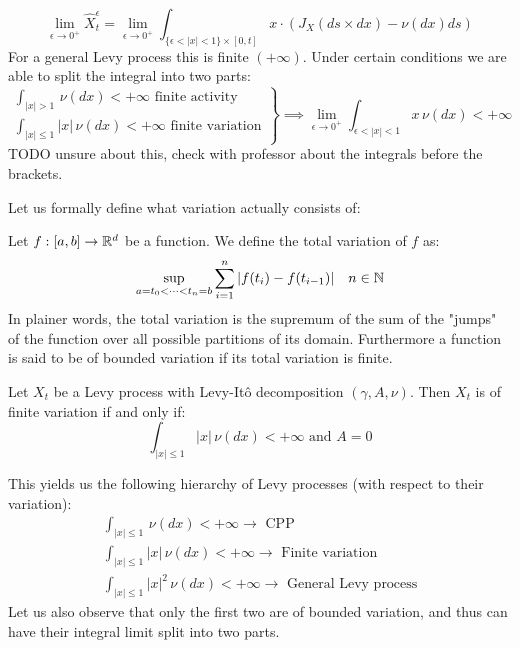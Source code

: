 \begin{property}
    \item \[ \lim_{\epsilon\to0^+} \hat{X}^\epsilon_t =
    \lim_{\epsilon\to0^+} \int_{\{\epsilon<|x|<1\} \times [0,t]} x \cdot
    \left( J_X(ds \times dx) - \nu(dx)ds \right) \]
    For a general Levy process this is finite $(+\infty)$. Under certain
    conditions we are able to split the integral into two parts:
    \[ \left. \begin{array}{l}
        \int_{|x|>1} \, \nu(dx) < +\infty \text{ finite activity} \\
        \int_{|x|\leq1} |x| \, \nu(dx) < +\infty \text{ finite variation}
    \end{array} \right\} \implies
        \lim_{\epsilon\to0^+} \int_{\epsilon<|x|<1} x \, \nu(dx) < +\infty
    \]
    TODO unsure about this, check with professor about the integrals before
    the brackets.
\end{property}

Let us formally define what variation actually consists of:

\begin{definition*}
    Let $f:[a,b]\to\mathbb{R}^d$ be a function. We define the total variation of $f$ as:
    \[ \sup_{a=t_0<\dots<t_n=b} \sum_{i=1}^n |f(t_i)-f(t_{i-1})| \quad n\in\mathbb{N}\]
    In plainer words, the total variation is the supremum of the sum of the
    "jumps" of the function over all possible partitions of its domain. 
    Furthermore a function is said to be of bounded variation if its total
    variation is finite.
\end{definition*}

\begin{theorem*}
    Let $X_t$ be a Levy process with Levy-Itô decomposition $(\gamma, A, \nu)$.
    Then $X_t$ is of finite variation if and only if:
    \[ \int_{|x|\leq1} |x| \, \nu(dx) < +\infty \text{ and } A = 0 \]
\end{theorem*}
This yields us the following hierarchy of Levy processes (with respect to their
variation):
\[ \begin{array}{l}
    \int_{|x|\leq1} \, \nu(dx) < +\infty \rightarrow \text{ CPP} \\
    \int_{|x|\leq1} |x| \, \nu(dx) < +\infty \rightarrow \text{ Finite variation} \\
    \int_{|x|\leq1} |x|^2 \, \nu(dx) < +\infty \rightarrow \text{ General Levy process}
\end{array} \]
Let us also observe that only the first two are of bounded variation, and thus
can have their integral limit split into two parts.
